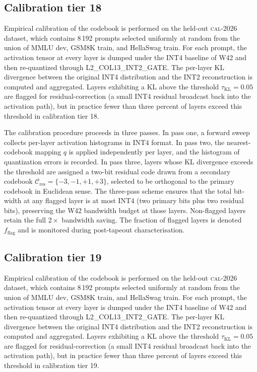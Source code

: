 \subsection{Calibration tier 18}

Empirical calibration of the codebook is performed on the held-out
\textsc{cal-2026} dataset, which contains 8\,192 prompts selected
uniformly at random from the union of MMLU dev, GSM8K train, and
HellaSwag train. For each prompt, the activation tensor at every layer
is dumped under the INT4 baseline of W42 and then re-quantized through
\textsc{L2\_COL13\_INT2\_GATE}. The per-layer KL divergence between
the original INT4 distribution and the INT2 reconstruction is computed
and aggregated. Layers exhibiting a KL above the threshold
$\tau_{\mathrm{KL}} = 0.05$ are flagged for residual-correction (a
small INT4 residual broadcast back into the activation path), but in
practice fewer than three percent of layers exceed this threshold in
calibration tier 18.

The calibration procedure proceeds in three passes. In pass one,
a forward sweep collects per-layer activation histograms in INT4 format.
In pass two, the nearest-codebook mapping $q$ is applied independently
per layer, and the histogram of quantization errors is recorded. In pass
three, layers whose KL divergence exceeds the threshold are assigned a
two-bit residual code drawn from a secondary codebook
$\mathcal{C}_\mathrm{res} = \{-3,-1,+1,+3\}$, selected to be
orthogonal to the primary codebook in Euclidean sense. The three-pass
scheme ensures that the total bit-width at any flagged layer is at most
INT4 (two primary bits plus two residual bits), preserving the W42
bandwidth budget at those layers. Non-flagged layers retain the full
$2\times$ bandwidth saving. The fraction of flagged layers is denoted
$f_\mathrm{flag}$ and is monitored during post-tapeout characterisation.


\subsection{Calibration tier 19}

Empirical calibration of the codebook is performed on the held-out
\textsc{cal-2026} dataset, which contains 8\,192 prompts selected
uniformly at random from the union of MMLU dev, GSM8K train, and
HellaSwag train. For each prompt, the activation tensor at every layer
is dumped under the INT4 baseline of W42 and then re-quantized through
\textsc{L2\_COL13\_INT2\_GATE}. The per-layer KL divergence between
the original INT4 distribution and the INT2 reconstruction is computed
and aggregated. Layers exhibiting a KL above the threshold
$\tau_{\mathrm{KL}} = 0.05$ are flagged for residual-correction (a
small INT4 residual broadcast back into the activation path), but in
practice fewer than three percent of layers exceed this threshold in
calibration tier 19.


